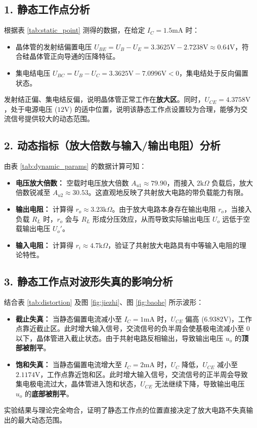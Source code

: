 ﻿\documentclass[10.5pt]{config}
\begin{document}
\subsection*{1. 静态工作点分析}
根据表 \ref{tab:static_point} 测得的数据，在给定 $I_C = 1.5\mathrm{mA}$ 时：
\begin{itemize}[leftmargin=2em]
    \item 晶体管的发射结偏置电压 $U_{BE} = U_B - U_E = 3.3625\mathrm{V} - 2.7238\mathrm{V} \approx 0.64\mathrm{V}$，符合硅晶体管正向导通的压降特征。
    \item 集电结电压 $U_{BC} = U_B - U_C = 3.3625\mathrm{V} - 7.0996\mathrm{V} < 0$，集电结处于反向偏置状态。
\end{itemize}
发射结正偏、集电结反偏，说明晶体管正常工作在\textbf{放大区}。同时，$U_{CE} = 4.3758\mathrm{V}$，处于电源电压 ($12\mathrm{V}$) 的适中位置，说明该静态工作点设置较为合理，能够为交流信号提供较大的动态范围。

\subsection*{2. 动态指标（放大倍数与输入/输出电阻）分析}
由表 \ref{tab:dynamic_params} 的数据计算可知：
\begin{itemize}[leftmargin=2em]
    \item \textbf{电压放大倍数：} 空载时电压放大倍数 $A_{u1} \approx 79.90$，而接入 $2\mathrm{k}\Omega$ 负载后，放大倍数锐减至 $A_{u2} \approx 30.53$。这直观地反映了共射放大电路的带负载能力有限。
    \item \textbf{输出电阻：} 计算得 $r_o \approx 3.23\mathrm{k}\Omega$。由于放大电路本身存在输出电阻 $r_o$，当接入负载 $R_L$ 时，$r_o$ 会与 $R_L$ 形成分压效应，从而导致实际输出电压 $U_o$ 远低于空载输出电压 $U_o'$。
    \item \textbf{输入电阻：} 计算得 $r_i \approx 4.7\mathrm{k}\Omega$，验证了共射放大电路具有中等输入电阻的理论特性。
\end{itemize}

\subsection*{3. 静态工作点对波形失真的影响分析}
结合表 \ref{tab:distortion} 及图 \ref{fig:jiezhi}、图 \ref{fig:baohe} 所示波形：
\begin{itemize}[leftmargin=2em]
    \item \textbf{截止失真：} 当静态偏置电流减小至 $I_C = 1\mathrm{mA}$ 时，$U_{CE}$ 偏高 ($6.9382\mathrm{V}$)，工作点靠近截止区。此时增大输入信号，交流信号的负半周会使基极电流减小至 0 以下，晶体管进入截止状态。由于共射电路反相输出，导致输出电压 $u_o$ 的\textbf{顶部被削平}。
    \item \textbf{饱和失真：} 当静态偏置电流增大至 $I_C = 2\mathrm{mA}$ 时，$U_C$ 降低，$U_{CE}$ 减小至 $2.1174\mathrm{V}$，工作点靠近饱和区。此时增大输入信号，交流信号的正半周会导致集电极电流过大，晶体管进入饱和状态，$U_{CE}$ 无法继续下降，导致输出电压 $u_o$ 的\textbf{底部被削平}。
\end{itemize}
实验结果与理论完全吻合，证明了静态工作点的位置直接决定了放大电路不失真输出的最大动态范围。
\end{document}
